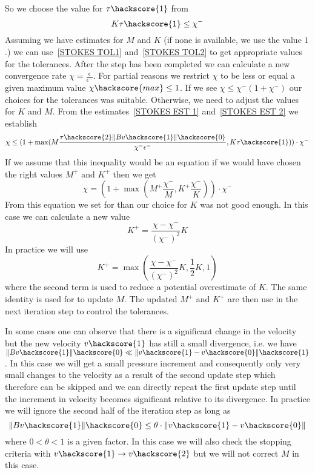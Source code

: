 So we choose the value for $\tau\hackscore{1}$ from
\begin{equation} \label{STOKES TOL1}
K \tau\hackscore{1} \le \chi^{-}
\end{equation}
Assuming we have estimates for $M$ and $K$ (if none is available, we use the value $1$.)
we can use~\ref{STOKES TOL1} and~\ref{STOKES TOL2} to get appropriate values for the tolerances. After
the step has been completed we can calculate a new convergence rate $\chi =\frac{\epsilon}{\epsilon^{-}}$. 
For partial reasons we restrict $\chi$ to be less or equal a given maximum value $\chi\hackscore{max}\le 1$.
If we see $\chi \le \chi^{-} (1+\chi^{-})$ our choices for the tolerances was suitable. Otherwise, we need to adjust the values for $K$ and $M$. From the estimates~\ref{STOKES EST 1} and~\ref{STOKES EST 2} we establish
\begin{equation}\label{STOKES EST 3}
\chi \le ( 1 + \max(M \frac{\tau\hackscore{2} \|B v\hackscore{1}\|\hackscore{0}}{\chi^{-} \epsilon^{-}},K \tau\hackscore{1}  ) ) \cdot \chi^{-} 
\end{equation}
If we assume that this inequality would be an equation if we would have chosen the right values
$M^{+}$ and $K^{+}$ then we get 
\begin{equation}\label{STOKES EST 3b}
\chi =  ( 1 + \max(M^{+} \frac{\chi^{-}}{M},K^{+} \frac{\chi^{-}}{K}) ) \cdot \chi^{-} 
\end{equation}
From this equation we set for 
than our choice for $K$ was not good enough. In this case we can calculate a new value
 \begin{equation}
K^{+} =  \frac{\chi-\chi^{-}}{(\chi^{-})^2} K
\end{equation}
In practice we will use 
 \begin{equation}
K^{+}  = \max(\frac{\chi-\chi^{-}}{(\chi^{-})^2} K,\frac{1}{2}K,1)
\end{equation}
where the second term is used to reduce a potential overestimate of $K$.  
The same identity is used for to update $M$. The updated $M^{+}$ and $K^{+}$ 
are then use in the next iteration step to control the tolerances. 

In some cases one can observe that there is a significant change 
in the velocity but the new velocity $v\hackscore{1}$ has still a 
small divergence, i.e. we have
$\|Bv\hackscore{1}\|\hackscore{0} \ll \|v\hackscore{1}-v\hackscore{0}\|\hackscore{1}$. 
In this case we will get a small pressure increment and consequently only very small changes to
the velocity as a result of the second update step which therefore can be skipped and
we can directly repeat the first update step until the increment in velocity becomes
significant relative to its divergence. In practice we will ignore the second half of the iteration step
as long as 
 \begin{equation}\label{STOKES LARGE BV1}
\|Bv\hackscore{1}\|\hackscore{0} \le \theta \cdot \|v\hackscore{1}-v\hackscore{0}\| 
\end{equation}
where $0<\theta<1$ is a given factor. In this case we will also check the stopping criteria 
with $v\hackscore{1}\rightarrow v\hackscore{2}$ but we will not correct $M$ in this case.

